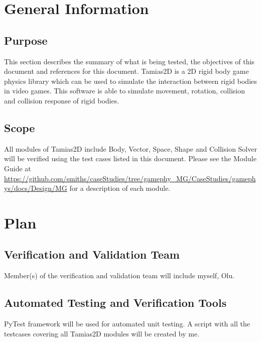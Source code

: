 \documentclass[12pt, titlepage]{article}
\newcommand{\progname}{Tamias2D}
\begin{document}

\section{General Information}
\subsection{Purpose}

This section describes the summary of what is being tested, the objectives of this document and references for this document. \progname{} is a 2D rigid body game physics library which can be used to simulate the interaction between rigid bodies in video games. This software is able to simulate movement, rotation, collision and collision response of rigid bodies.

\subsection{Scope}

All modules of \progname{} include Body, Vector, Space, Shape and Collision Solver will be verified using the test cases listed in this document. Please see the Module Guide at \url{https://github.com/smiths/caseStudies/tree/gamephy_MG/CaseStudies/gamephys/docs/Design/MG} for a description of each module.

\section{Plan}
	
\subsection{Verification and Validation Team}

Member(s) of the verification and validation team will include myself, Olu.

\subsection{Automated Testing and Verification Tools}

PyTest framework will be used for automated unit testing. A script with all the testcases covering all \progname{} modules will be created by me.
\end{document}

